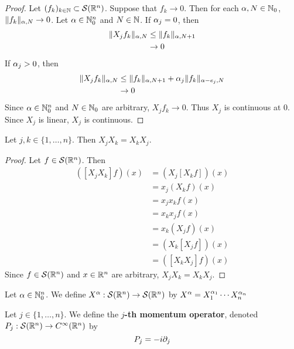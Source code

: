 \documentclass{book}
\begin{document}
	\begin{proof} 
		 Let $(f_k)_{k \in \mathbb{N}} \subset \mathcal{S}(\mathbb{R}^n)$. Suppose that $f_k \rightarrow 0$. Then for each $\alpha, N \in \mathbb{N}_0$, $\|f_k\|_{\alpha, N} \rightarrow 0$. Let $\alpha \in \mathbb{N}_0^n$ and $N \in \mathbb{N}$. If $\alpha_j = 0$, then 
		\begin{align*}
			\|X_jf_k\|_{\alpha, N} 
			& \leq \|f_k\|_{\alpha, N+1} \\
			& \rightarrow 0
		\end{align*}
		If $\alpha_j > 0$, then 
		\begin{align*}
			\|X_jf_k\|_{\alpha, N} 
			& \leq \|f_k\|_{\alpha, N+1} + \alpha_j\|f_k\|_{\alpha - e_j, N}\\
			& \rightarrow 0
		\end{align*}
		Since $\alpha \in \mathbb{N}_0^n$ and $N \in \mathbb{N}_0$ are arbitrary, $X_jf_k \rightarrow 0$. Thus $X_j$ is continuous at $0$. Since $X_j$ is linear, $X_j$ is continuous.
	\end{proof}

	\begin{ex} 
		Let $j,k \in \{1, \ldots, n\}$. Then $X_jX_k = X_kX_j$.
	\end{ex}
	
	\begin{proof}
		Let $f \in \mathcal{S}(\mathbb{R}^n)$. Then  
		\begin{align*}
			([X_jX_k] f) (x) 
			& = (X_j [X_k f]) (x) \\
			& = x_j (X_kf) (x) \\
			& = x_j x_k f(x) \\
			& = x_k x_j f(x) \\
			& = x_k (X_j f) (x) \\
			& = (X_k [X_j f]) (x) \\
			& = ([X_k X_j] f)(x)
		\end{align*}
		Since $f \in \mathcal{S}(\mathbb{R}^n)$ and $x \in \mathbb{R}^n$ are arbitrary, $X_jX_k = X_kX_j$. 
	\end{proof}
	
	\begin{defn} 
		Let $\alpha \in \mathbb{N}_0^n$. We define $X^{\alpha}: \mathcal{S}(\mathbb{R}^n) \rightarrow \mathcal{S}(\mathbb{R}^n)$ by 
		$X^{\alpha} = X_1^{\alpha_1} \cdots X_n^{\alpha_n}$ 
	\end{defn}

	\begin{defn} 
		Let $j \in \{1, \ldots, n\}$. We define the \textbf{$j$-th momentum operator}, denoted $P_j: \mathcal{S}(\mathbb{R}^n) \rightarrow C^{\infty}(\mathbb{R}^n)$ by 
		$$P_j = -i \partial_j $$
	\end{defn}
\end{document}

